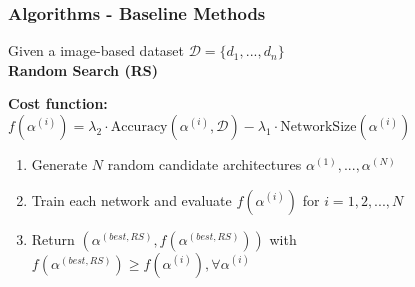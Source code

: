 \documentclass{beamer}
\begin{document}
    \begin{frame}
        \frametitle{Algorithms - Baseline Methods}
        Given a image-based dataset $\mathcal{D} = \{d_1, ..., d_n\}$ \\
        \vspace{2mm}
        \textbf{Random Search (RS)} \\
        {\small
        \textbf{Cost function:} $f(\alpha^{(i)}) = \lambda_2 \cdot \text{Accuracy}(\alpha^{(i)}, \mathcal{D}) - \lambda_1 \cdot \text{NetworkSize}(\alpha^{(i)})$ 
        \begin{enumerate}
            \item Generate $N$ random candidate architectures $\alpha^{(1)}, ..., \alpha^{(N)}$
            \item Train each network and evaluate $f(\alpha^{(i)})$ for $i = 1, 2, ..., N$
            \item Return $(\alpha^{(best, RS)}, f(\alpha^{(best, RS)}))$ with $f(\alpha^{(best, RS)}) \geq f(\alpha^{(i)}), \forall \alpha^{(i)}$
        \end{enumerate}}
        \vspace{2mm}
    \end{frame}
\end{document}
